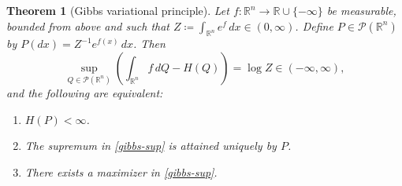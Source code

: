 \documentclass[11pt,reqno]{amsart}
\numberwithin{equation}{section}
\newtheorem{theorem}{Theorem}[section]
\theoremstyle{definition}
\def\R{{\mathbb R}}
\def\P{{\mathcal P}}
\begin{document}
\begin{theorem}[Gibbs variational principle] \label{th:gibbs}
Let $ f : \R^n \to \R \cup \{-\infty\} $ be measurable, bounded from above and such that $ Z \coloneqq \int_{\R^n} e^f \, dx \in (0, \infty)$. Define $P\in\P(\R^n)$ by $P(dx)=Z^{-1}e^{f(x)}\,dx$. Then 
	\begin{equation}
		\sup_{Q \in \P(\R^n) } \left( \int_{\R^n} f \,dQ - H(Q)\right) = \log Z \in (-\infty ,\infty), \label{gibbs-sup}
	\end{equation}
and the following are equivalent:
\begin{enumerate}
	\item $ H(P) < \infty $.
\item  The supremum in \eqref{gibbs-sup}
is attained uniquely by $P$.
\item There exists a maximizer in \eqref{gibbs-sup}.
\end{enumerate} 
\end{theorem}
\end{document}
